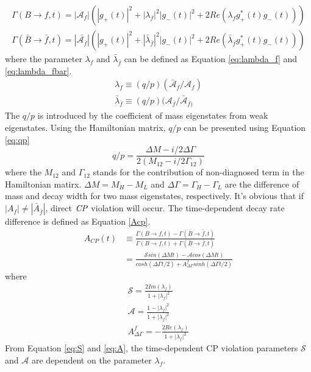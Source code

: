 \begin{eqnarray}
\Gamma(B\to f,t)=|\mathcal{A}_f|(|g_+(t)|^2+|\lambda_f|^2|g_-(t)|^2+2Re(\lambda_f g^*_+(t)g_-(t))) \label{eq:gamma_B}\\
\Gamma(\bar{B}\to \bar{f},t)=|\bar{\mathcal{A}_{\bar{f}}}|(|g_+(t)|^2+|\bar{\lambda}_{\bar{f}}|^2|g_-(t)|^2+2Re(\bar{\lambda}_{\bar{f}} g^*_+(t)g_-(t)))\label{eq:gamma_Bbar}
\end{eqnarray} where the parameter $\lambda_f$ and $\bar{\lambda}_{\bar{f}}$ can be defined as Equation \ref{eq:lambda_f} and \ref{eq:lambda_fbar}.
\begin{eqnarray}
\lambda_f \equiv (q/p) (\bar{\mathcal{A}}_f / \mathcal{A}_f) \label{eq:lambda_f}\\
\bar{\lambda}_{\bar{f}} \equiv (q/p) ( \mathcal{A}_{\bar{f}}/\bar{\mathcal{A}}_{\bar{f})} \label{eq:lambda_fbar}
\end{eqnarray} 
The $q/p$ is introduced by the coefficient of mass eigenstates from weak eigenstates. Using the Hamiltonian matrix, $q/p$ can be presented using Equation \ref{eq:qp}
\begin{equation}\label{eq:qp}
	q/p = \frac{\Delta M - i/2 \Delta \Gamma}{2(M_{12}- i/2 \Gamma_{12})}
\end{equation}
where the $M_{12}$ and $\Gamma_{12}$ stands for the contribution of non-diagnosed term in the Hamiltonian matirx. $\Delta{M}=M_H-M_L$ and $\Delta{\Gamma}=\Gamma_H-\Gamma_L$ are the difference of mass and decay width for two mass eigenstates, respectively.
It's obvious that if $|A_f| \neq |\bar{A}_{\bar{f}}|$, direct $\it{CP}$ violation will occur.  
The time-dependent decay rate difference is defined as Equation \ref{Acp}.
\begin{equation}\label{Acp}
\begin{split}
A_{CP}(t)&\equiv \frac{\Gamma(B\to f,t)-\Gamma(\bar{B}\to \bar{f},t)}{\Gamma(B\to f,t)+\Gamma(\bar{B}\to \bar{f},t)}\\
&=\frac{\mathcal{S} sin(\Delta{M}t)-\mathcal{A}cos(\Delta{M}t)}
{cosh(\Delta \Gamma t/2)+A^f_{\Delta \Gamma}sinh(\Delta \Gamma t/2)}
\end{split}
\end{equation}
where
\begin{eqnarray}\label{cp-parameters}
\mathcal{S}=\frac{2Im(\lambda_f)}{1+|\lambda_f|^2} \label{eq:S}\\
\mathcal{A}=\frac{1-|\lambda_f|^2}{1+|\lambda_f|^2}\label{eq:A}\\
A^f_{\Delta \Gamma}=-\frac{2Re(\lambda_f)}{1+|\lambda_f|^2}
\end{eqnarray}
From Equation \ref{eq:S} and \ref{eq:A}, the time-dependent CP violation parameters $\mathcal{S}$ and $\mathcal{A}$ are dependent on the parameter $\lambda_f$.

